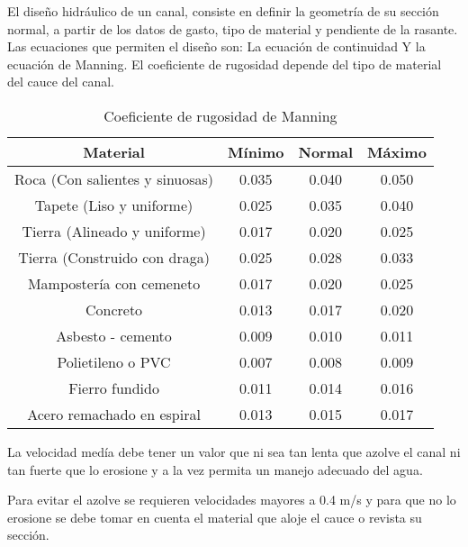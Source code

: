 El diseño hidráulico de un canal, consiste en definir la geometría de su sección normal, a partir de los datos de gasto, tipo de material y pendiente de la rasante.
Las ecuaciones que permiten el diseño son:
La ecuación de continuidad Y la ecuación de Manning.
El coeficiente de rugosidad depende del tipo de material del cauce del canal.
\begin{table}[h!]
    \centering
    \begin{tabular}{@{}cccc@{}}
    \toprule
    Material                        & Mínimo & Normal & Máximo \\ \midrule
    Roca (Con salientes y sinuosas) & 0.035  & 0.040  & 0.050  \\
    Tapete (Liso y uniforme)        & 0.025  & 0.035  & 0.040  \\
    Tierra (Alineado y uniforme)    & 0.017  & 0.020  & 0.025  \\
    Tierra (Construido con draga)   & 0.025  & 0.028  & 0.033  \\
    Mampostería con cemeneto        & 0.017  & 0.020  & 0.025  \\
    Concreto                        & 0.013  & 0.017  & 0.020  \\
    Asbesto - cemento               & 0.009  & 0.010  & 0.011  \\
    Polietileno o PVC               & 0.007  & 0.008  & 0.009  \\
    Fierro fundido                  & 0.011  & 0.014  & 0.016  \\
    Acero remachado en espiral      & 0.013  & 0.015  & 0.017  \\ \bottomrule
    \end{tabular}
    \caption{Coeficiente de rugosidad de Manning}
    \label{tabhb38}
\end{table}
La velocidad medía debe tener un valor que ni sea tan lenta que azolve el canal ni tan fuerte que lo erosione y a la vez permita un manejo adecuado del agua.

Para evitar el azolve se requieren velocidades mayores a 0.4 m/s y para que no lo erosione se debe tomar en cuenta el material que aloje el cauce o revista su sección.

